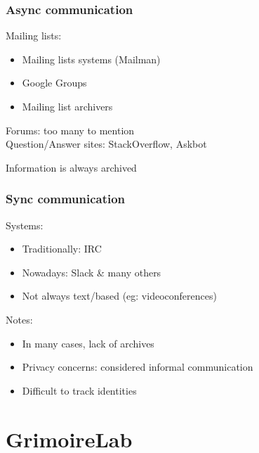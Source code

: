\documentclass[17pt,aspectratio=169,hyperref=pdfusetitle]{beamer}
\begin{document}

\begin{frame}
\frametitle{Async communication}

  Mailing lists: \\
  \begin{itemize}
  \item Mailing lists systems (Mailman)
  \item Google Groups
  \item Mailing list archivers
  \end{itemize}

  Forums: too many to mention \\

  Question/Answer sites: StackOverflow, Askbot  \\

  \begin{flushright}
    Information is always archived
  \end{flushright}
\end{frame}


\begin{frame}
\frametitle{Sync communication}

  Systems:

  \begin{itemize}
  \item Traditionally: IRC
  \item Nowadays: Slack \& many others
  \item Not always text/based (eg: videoconferences)
  \end{itemize}
  
  Notes:
  
  \begin{itemize}
  \item In many cases, lack of archives
  \item Privacy concerns: considered informal communication
  \item Difficult to track identities
  \end{itemize}
\end{frame}

\section{GrimoireLab}
\end{document}
